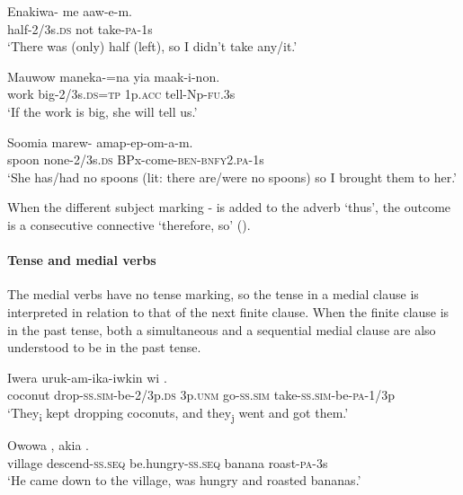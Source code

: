 \ea%
\label{ex:3:x250}
\gll Enakiwa- me aaw-e-m. \\
half-2/3s.\textsc{ds} not take-\textsc{pa}-1s \\
\glt`There was (only) half (left), so I didn't take any/it.'
\z

\ea%
\label{ex:3:x251}
\gll Mauwow maneka-=na yia maak-i-non. \\
work big-2/3s.\textsc{ds}=\textsc{tp} 1p.\textsc{acc} tell-Np-\textsc{fu}.3s \\
\glt`If the work is big, she will tell us.'
\z

\ea%
\label{ex:3:x252}
\gll Soomia marew- amap-ep-om-a-m. \\
spoon none-2/3s.\textsc{ds} BPx-come-\textsc{ben}-\textsc{bnfy}2.\textsc{pa}-1s \\
\glt`She has/had no spoons (lit: there are/were no spoons) so I brought them to her.'
\z

When the different subject marking \nobreakdash- is added to the adverb  `thus', the outcome is a consecutive connective `therefore, so' ().

\paragraph{Tense and medial verbs}
{}
The medial verbs have no tense marking, so the tense in a medial clause is interpreted in relation to that of the next finite clause. When the finite clause is in the past tense, both a simultaneous  and a sequential medial clause  are also understood to be in the past tense.

\ea%
\label{ex:3:x1025}
\gll Iwera uruk-am-ika-iwkin wi  .\\
coconut drop-\textsc{ss}.\textsc{sim}-be-2/3p.\textsc{ds} 3p.\textsc{unm} go-\textsc{ss}.\textsc{sim} take-\textsc{ss}.\textsc{sim}-be-\textsc{pa}-1/3p\\
\glt`They\textsubscript{i} kept dropping coconuts, and they\textsubscript{j} went and got them.'
\z

\ea%
\label{ex:3:x1023}
\gll Owowa  , akia . \\
village descend-\textsc{ss}.\textsc{seq} be.hungry-\textsc{ss}.\textsc{seq} banana roast-\textsc{pa}-3s\\
\glt`He came down to the village, was hungry and roasted bananas.'
\z


